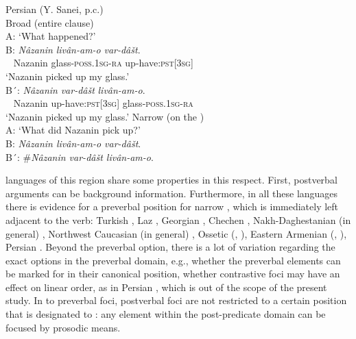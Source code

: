 \documentclass[output=paper,colorlinks,citecolor=brown]{langscibook}
\begin{document}
\begin{samepage}
\ea \label{ex:Persian}
    Persian (Y. Sanei, p.c.) \\ 
    \ea Broad  (entire clause)\\
    A: ‘What happened?’\\ 
    \gll \textup{B:} \textit{Nâzanin} \textit{livân-am-o} \textit{var-dâšt}.\\
         ~ Nazanin glass-\textsc{poss.1sg}-\textsc{ra} up-have:\textsc{pst}[\textsc{3sg}]\\
    \glt \hspace{0.4cm}‘Nazanin picked up my glass.’\\
    \gll  \textup{B´:} \textit{Nâzanin} \textit{var-dâšt} \textit{livân-am-o}.\\
        ~ Nazanin up-have:\textsc{pst}[\textsc{3sg}] glass-\textsc{poss.1sg}-\textsc{ra}\\
    \glt \hspace{0.5cm}‘Nazanin picked up my glass.’
    \ex Narrow  (on the )\\
        A: ‘What did Nazanin pick up?’\\
        B: \textit{Nâzanin livân-am-o var-dâšt}.\\
        B´: \#\textit{Nâzanin var-dâšt livân-am-o}.\\
    \z
\z
\end{samepage}    

\begin{sloppypar}
 languages of this region share some properties in this respect. First, postverbal arguments can be background information. Furthermore, in all these languages there is evidence for a preverbal position for narrow , which is immediately left adjacent to the verb: Turkish \citep[]{goksel_is_2000}, Laz \citep[852]{lacroix_laz_2018}, Georgian \citep[235]{borise_phrasing_2019}, Chechen \citep[322]{komen_finding_2013}{},  Nakh-Daghestanian (in general)  \citep[977]{forker_information_2021}, Northwest Caucasian (in general) \citep[986]{forker_information_2021}, Ossetic (\citealt[686]{erschler_preverbal_2012}, \citealt[]{borise_flexible_2023}), Eastern Armenian (\citealt[19]{comrie_formal_1984}, \citealt[464--467]{samvelian_persistence_2023}), Persian \citep[]{kahnemuyipour_wh-questions_2001}. Beyond the preverbal option, there is a lot of variation regarding the exact  options in the preverbal domain, e.g., whether the preverbal elements can be marked for  in their canonical position, whether contrastive foci may have an effect on linear order, as in Persian \citep[92]{karimi_object_2003}, which is out of the scope of the present study. In  to preverbal foci, postverbal foci are not restricted to a certain position that is designated to : any element within the post-predicate domain can be focused by prosodic means.
\end{sloppypar}
\end{document}
